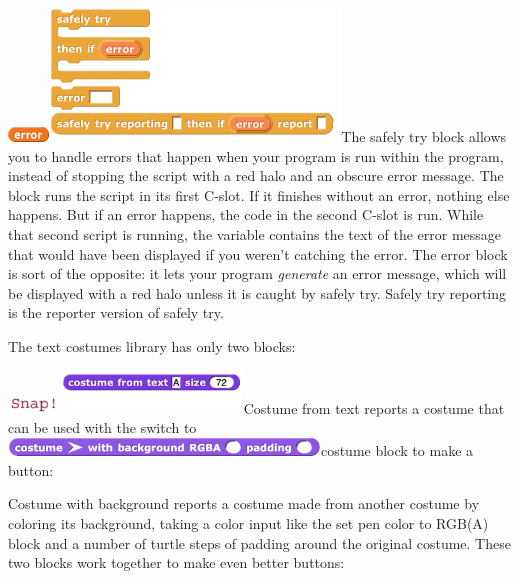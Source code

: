 \includegraphics[width=0.43056in,height=0.15278in]{media/image443.png}\includegraphics[width=3.04167in,height=1.39583in]{media/image444.png}The
safely try block allows you to handle errors that happen when your
program is run within the program, instead of stopping the script with a
red halo and an obscure error message. The block runs the script in its
first C-slot. If it finishes without an error, nothing else happens. But
if an error happens, the code in the second C-slot is run. While that
second script is running, the variable contains the text of the error
message that would have been displayed if you weren't catching the
error. The error block is sort of the opposite: it lets your program
\emph{generate} an error message, which will be displayed with a red
halo unless it is caught by safely try. Safely try reporting is the
reporter version of safely try.

The text costumes library has only two blocks:

\includegraphics[width=0.53472in,height=0.20833in]{media/image445.png}\includegraphics[width=1.92in,height=0.45078in]{media/image446.png}Costume
from text reports a costume that can be used with the switch to
\includegraphics[width=3.25972in,height=0.18958in]{media/image447.png}costume
block to make a button:

Costume with background reports a costume made from another costume by
coloring its background, taking a color input like the set pen color to
RGB(A) block and a number of turtle steps of padding around the original
costume. These two blocks work together to make even better buttons:

